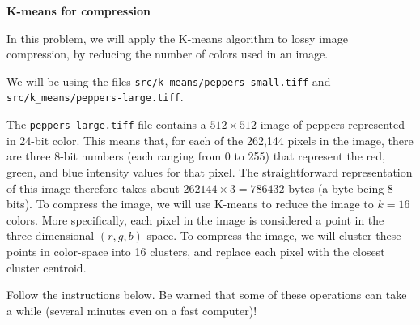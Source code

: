 \item {} {\bf K-means for compression}

In this problem, we will apply the K-means algorithm to lossy image
compression, by reducing the number of colors used in an image.

We will be using the files \texttt{src/k\_means/peppers-small.tiff} and \texttt{src/k\_means/peppers-large.tiff}.
	

The \texttt{peppers-large.tiff} file contains
a $512 \times 512$ image of peppers represented in 24-bit color. This means
that, for each of the 262,144 pixels in the image, there are three
8-bit numbers (each ranging from 0 to 255) that represent the red,
green, and blue intensity values for that pixel. The straightforward
representation of this image therefore takes about $262144 \times 3 =
786432$ bytes (a byte being 8 bits). To compress the image, we will
use K-means to reduce the image to $k = 16$ colors. More specifically,
each pixel in the image is considered a point in the three-dimensional
$(r, g, b)$-space. To compress the image, we will cluster these points
in color-space into 16 clusters, and replace each pixel with the
closest cluster centroid.

Follow the instructions below. Be warned that some of these operations
can take a while (several minutes even on a fast computer)!


\begin{enumerate}

  
  
\ifnum{} {
  
} \fi


  

\ifnum{} {
  
} \fi

\end{enumerate}


